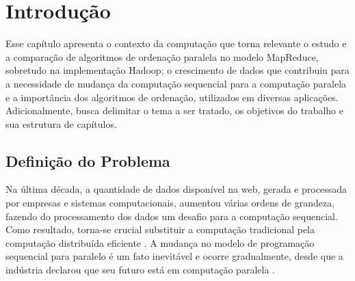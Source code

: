 \chapter{Introdução}
\label{cap:introducao}


Esse capítulo apresenta o contexto da computação que torna relevante o estudo e a comparação de algoritmos de ordenação paralela no modelo MapReduce, sobretudo na implementação Hadoop; o crescimento de dados que contribuiu para a necessidade de mudança da computação sequencial para a computação paralela e a importância dos algoritmos de ordenação, utilizados em diversas aplicações. Adicionalmente, busca delimitar o tema a ser tratado, os objetivos do trabalho e sua estrutura de capítulos.  


%


\section{Definição do Problema}

%
%

Na última década, a quantidade de dados  disponível na web, gerada e processada por empresas e sistemas computacionais, aumentou várias ordens de grandeza, fazendo do processamento dos dados um desafio para a computação sequencial. Como resultado, torna-se crucial substituir a computação tradicional pela computação distribuída eficiente \cite{Lin:2010}. A mudança no modelo de programação sequencial para paralelo é um fato inevitável e ocorre gradualmente, desde que a indústria declarou que seu futuro está em computação paralela \cite{Asanovic:2009}.

